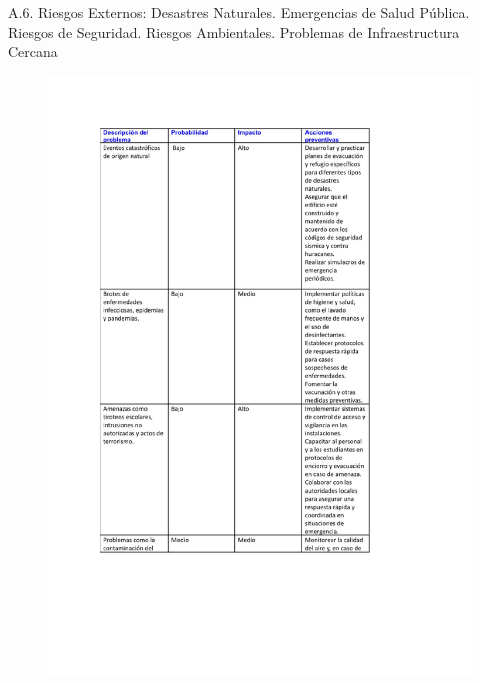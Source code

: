     A.6. Riesgos Externos:
     Desastres Naturales.
     Emergencias de Salud Pública.
     Riesgos de Seguridad.
     Riesgos Ambientales.
     Problemas de Infraestructura Cercana
    \begin{figure}[H]
        \centering
        \includegraphics[trim = {0mm 0mm 0mm 0mm},clip,scale=0.4]{20/img/Riesgos Externos.pdf}

\end{figure}
